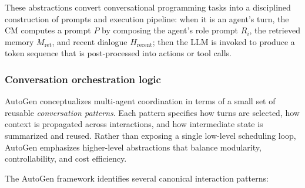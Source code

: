 These abstractions convert conversational programming tasks into a disciplined construction of prompts and execution pipeline: when it is an agent's turn, the CM computes a prompt \(P\) by composing the agent's role prompt \(R_i\), the retrieved memory \(M_{\mathrm{ret}}\), and recent dialogue \(H_{\mathrm{recent}}\); then the LLM is invoked to produce a token sequence that is post-processed into actions or tool calls.



\subsubsection{Conversation orchestration logic}
\label{sec:autogen_orchestration}

AutoGen conceptualizes multi-agent coordination in terms of a small set of reusable \emph{conversation patterns}. Each pattern specifies how turns are selected, how context is propagated across interactions, and how intermediate state is summarized and reused. Rather than exposing a single low-level scheduling loop, AutoGen emphasizes higher-level abstractions that balance modularity, controllability, and cost efficiency.

The AutoGen framework identifies several canonical interaction patterns:

